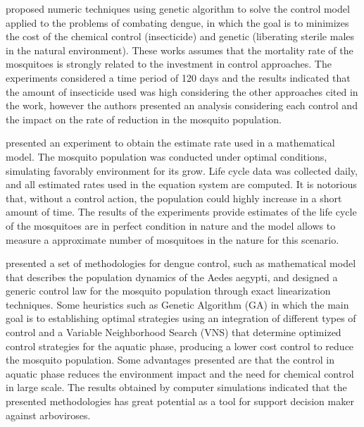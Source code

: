 \documentclass[a4paper,11pt]{article}
\begin{document}
\cite{bannwart-sbpo:2013,bannwart:2013}   proposed   numeric  techniques   using
genetic  algorithm  to solve  the  control  model  applied  to the  problems  of
combating dengue,  in which the  goal is to minimizes  the cost of  the chemical
control  (insecticide) and  genetic  (liberating sterile  males  in the  natural
environment). These works  assumes that the mortality rate of  the mosquitoes is
strongly  related  to the  investment  in  control approaches.  The  experiments
considered a time period  of 120 days and the results  indicated that the amount
of insecticide used was high considering the other approaches cited in the work,
however  the authors  presented an  analysis  considering each  control and  the
impact on the rate of reduction in the mosquito population.

\cite{cantane:2015} presented an experiment to  obtain the estimate rate used in
a  mathematical  model. The  mosquito  population  was conducted  under  optimal
conditions, simulating favorably  environment for its grow. Life  cycle data was
collected  daily, and  all  estimated  rates used  in  the  equation system  are
computed. It is  notorious that, without a control action,  the population could
highly  increase in  a short  amount  of time.  The results  of the  experiments
provide estimates of  the life cycle of the mosquitoes  are in perfect condition
in nature and the model allows to  measure a approximate number of mosquitoes in
the nature for this scenario.

\cite{dosreis:2018,florentino:2018,florentino-b:2018}   presented   a   set   of
methodologies for dengue control, such  as mathematical model that describes the
population dynamics of the Aedes aegypti, and designed a generic control law for
the mosquito population through  exact linearization techniques. Some heuristics
such as Genetic Algorithm (GA) in which the main goal is to establishing optimal
strategies using  an integration of  different types  of control and  a Variable
Neighborhood Search  (VNS) that determine  optimized control strategies  for the
aquatic phase, producing a lower cost control to reduce the mosquito population.
Some advantages  presented are  that the  control in  aquatic phase  reduces the
environment impact and the need for chemical control in large scale. The results
obtained by computer simulations indicated  that the presented methodologies has
great potential as a tool for support decision maker against arboviroses.
\end{document}
